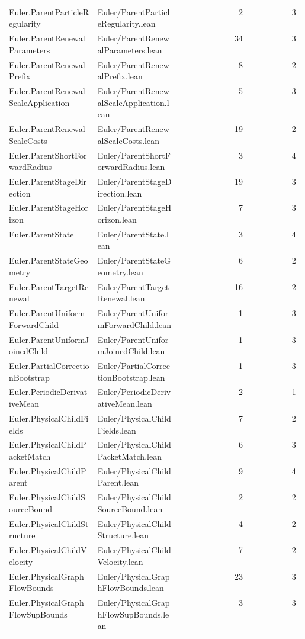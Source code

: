 \begin{longtable}{p{0.30\linewidth}p{0.28\linewidth}rr}
Euler.ParentParticleRegularity & Euler/ParentParticleRegularity.lean & 2 & 3\\
Euler.ParentRenewalParameters & Euler/ParentRenewalParameters.lean & 34 & 3\\
Euler.ParentRenewalPrefix & Euler/ParentRenewalPrefix.lean & 8 & 2\\
Euler.ParentRenewalScaleApplication & Euler/ParentRenewalScaleApplication.lean & 5 & 3\\
Euler.ParentRenewalScaleCosts & Euler/ParentRenewalScaleCosts.lean & 19 & 2\\
Euler.ParentShortForwardRadius & Euler/ParentShortForwardRadius.lean & 3 & 4\\
Euler.ParentStageDirection & Euler/ParentStageDirection.lean & 19 & 3\\
Euler.ParentStageHorizon & Euler/ParentStageHorizon.lean & 7 & 3\\
Euler.ParentState & Euler/ParentState.lean & 3 & 4\\
Euler.ParentStateGeometry & Euler/ParentStateGeometry.lean & 6 & 2\\
Euler.ParentTargetRenewal & Euler/ParentTargetRenewal.lean & 16 & 2\\
Euler.ParentUniformForwardChild & Euler/ParentUniformForwardChild.lean & 1 & 3\\
Euler.ParentUniformJoinedChild & Euler/ParentUniformJoinedChild.lean & 1 & 3\\
Euler.PartialCorrectionBootstrap & Euler/PartialCorrectionBootstrap.lean & 1 & 3\\
Euler.PeriodicDerivativeMean & Euler/PeriodicDerivativeMean.lean & 2 & 1\\
Euler.PhysicalChildFields & Euler/PhysicalChildFields.lean & 7 & 2\\
Euler.PhysicalChildPacketMatch & Euler/PhysicalChildPacketMatch.lean & 6 & 3\\
Euler.PhysicalChildParent & Euler/PhysicalChildParent.lean & 9 & 4\\
Euler.PhysicalChildSourceBound & Euler/PhysicalChildSourceBound.lean & 2 & 2\\
Euler.PhysicalChildStructure & Euler/PhysicalChildStructure.lean & 4 & 2\\
Euler.PhysicalChildVelocity & Euler/PhysicalChildVelocity.lean & 7 & 2\\
Euler.PhysicalGraphFlowBounds & Euler/PhysicalGraphFlowBounds.lean & 23 & 3\\
Euler.PhysicalGraphFlowSupBounds & Euler/PhysicalGraphFlowSupBounds.lean & 3 & 3\\

\end{longtable}
